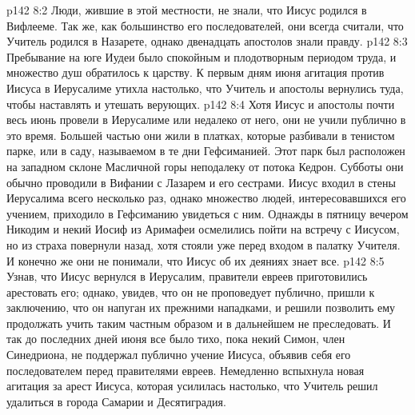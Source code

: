 \vs p142 8:2 Люди, жившие в этой местности, не знали, что Иисус родился в Вифлееме. Так же, как большинство его последователей, они всегда считали, что Учитель родился в Назарете, однако двенадцать апостолов знали правду.
\vs p142 8:3 Пребывание на юге Иудеи было спокойным и плодотворным периодом труда, и множество душ обратилось к царству. К первым дням июня агитация против Иисуса в Иерусалиме утихла настолько, что Учитель и апостолы вернулись туда, чтобы наставлять и утешать верующих.
\vs p142 8:4 Хотя Иисус и апостолы почти весь июнь провели в Иерусалиме или недалеко от него, они не учили публично в это время. Большей частью они жили в платках, которые разбивали в тенистом парке, или в саду, называемом в те дни Гефсиманией. Этот парк был расположен на западном склоне Масличной горы неподалеку от потока Кедрон. Субботы они обычно проводили в Вифании с Лазарем и его сестрами. Иисус входил в стены Иерусалима всего несколько раз, однако множество людей, интересовавшихся его учением, приходило в Гефсиманию увидеться с ним. Однажды в пятницу вечером Никодим и некий Иосиф из Аримафеи осмелились пойти на встречу с Иисусом, но из страха повернули назад, хотя стояли уже перед входом в палатку Учителя. И конечно же они не понимали, что Иисус об их деяниях знает все.
\vs p142 8:5 Узнав, что Иисус вернулся в Иерусалим, правители евреев приготовились арестовать его; однако, увидев, что он не проповедует публично, пришли к заключению, что он напуган их прежними нападками, и решили позволить ему продолжать учить таким частным образом и в дальнейшем не преследовать. И так до последних дней июня все было тихо, пока некий Симон, член Синедриона, не поддержал публично учение Иисуса, объявив себя его последователем перед правителями евреев. Немедленно вспыхнула новая агитация за арест Иисуса, которая усилилась настолько, что Учитель решил удалиться в города Самарии и Десятиградия.
